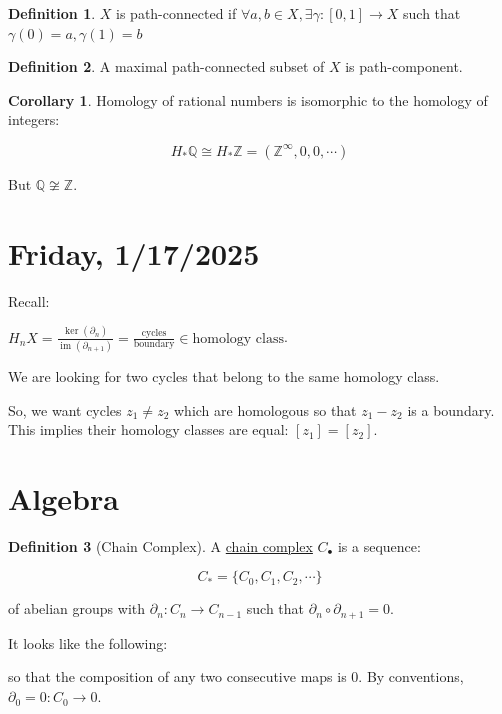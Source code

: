 \documentclass{article}
\theoremstyle{definition}
\newtheorem*{definition}{Definition}
\newtheorem{corollary}[theorem]{Corollary}
\begin{document}
    \begin{definition}
        \(X\) is path-connected if \(\forall a,b\in X, \exists \gamma: [0,1] \to X\) such that \(\gamma(0)=a, \gamma(1)=b\) 
    \end{definition}

    \begin{definition}
        A maximal path-connected subset of \(X\) is path-component.
    \end{definition}

    \begin{corollary}
        Homology of rational numbers is isomorphic to the homology of integers:

        \[
            H_{\ast} \mathbb{Q} \cong H_{\ast} \mathbb{Z} = (\mathbb{Z}^{\infty}, 0, 0, \cdots)
        \]

        But \(\mathbb{Q} \not\cong \mathbb{Z}\).
    \end{corollary}

    \section*{Friday, 1/17/2025}
    
    Recall:

    \(H_n X = \frac{\ker (\partial_n)}{\operatorname{im} (\partial_{n+1})} = \frac{\text{cycles}}{\text{boundary}} \in \text{homology class}\).

    We are looking for two cycles that belong to the same homology class.

    So, we want cycles \(z_1 \neq z_2\) which are homologous so that \(z_1 - z_2\) is a boundary. This implies their homology classes are equal: \([z_1] = [z_2]\).



    \section*{Algebra}

    \begin{definition}
        [Chain Complex] A \underline{chain complex} \(C_\bullet\) is a sequence:
        
        \[
            C_{\ast} = \{ C_0, C_1, C_2, \cdots \}
        \]
        
        of abelian groups with \(\partial_n : C_n \to C_{n-1}\) such that \(\partial_n \circ \partial_{n+1} = 0\).

        It looks like the following:

        \begin{center}
        \end{center}

        so that the composition of any two consecutive maps is \(0\). By conventions, \(\partial_0 = 0: C_0 \to 0\).
    \end{definition}
\end{document}
